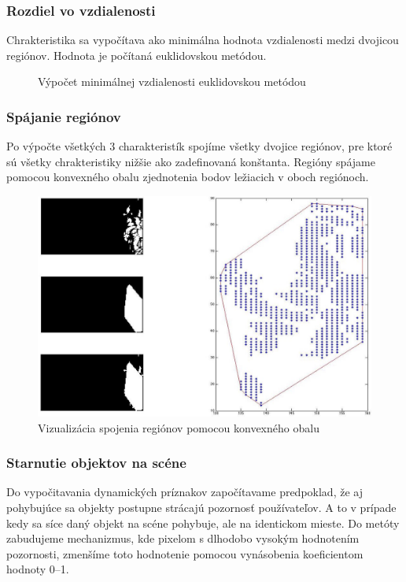 \subsubsection{Rozdiel vo vzdialenosti}
Chrakteristika sa vypočítava ako minimálna hodnota vzdialenosti medzi dvojicou regiónov.
Hodnota je počítaná euklidovskou metódou.

\begin{figure}[H]
  \begin{algorithm}[H]
   \caption{Výpočet minimálnej vzdialenosti euklidovskou metódou}
  \end{algorithm}
  \vspace{10mm}
\end{figure}

\subsubsection{Spájanie regiónov}
Po výpočte všetkých 3 charakteristík spojíme všetky dvojice regiónov, pre ktoré sú všetky chrakteristiky nižšie ako zadefinovaná konštanta.
Regióny spájame pomocou konvexného obalu zjednotenia bodov ležiacich v oboch regiónoch.
\begin{figure}[H]
  \centering
  \includegraphics[width=15cm]{pics/spojenie-regionov.jpg}
  \caption{Vizualizácia spojenia regiónov pomocou konvexného obalu}
  \vspace{10mm}
\end{figure}

\subsubsection{Starnutie objektov na scéne}
Do vypočitavania dynamických príznakov započítavame predpoklad, že aj pohybujúce sa objekty postupne strácajú pozornosť používateľov.
A to v prípade kedy sa síce daný objekt na scéne pohybuje, ale na identickom mieste.
Do metóty zabudujeme mechanizmus, kde pixelom s dlhodobo vysokým hodnotením pozornosti, zmenšíme toto hodnotenie pomocou  vynásobenia koeficientom hodnoty \numrange{0}{1}.

